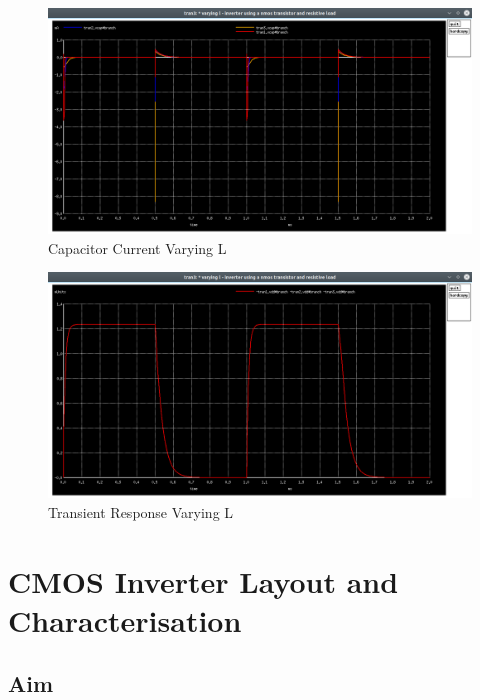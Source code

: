 \documentclass[12pt]{article}
\begin{document}
	\begin{figure}[H]
		\begin{center}
			\includegraphics[scale=0.25]{images/inverter_l_vcap.png}
			\caption{Capacitor Current Varying L}
			\label{fig::varying_l_vcap}
		\end{center}
	\end{figure}
	
	\begin{figure}[H]
		\begin{center}
			\includegraphics[scale=0.25]{images/inverter_l_vdd.png}
			\caption{Transient Response Varying L}
			\label{fig::varying_l_vdd}
		\end{center}
	\end{figure}
	
    
    
    \newpage
	\section{CMOS Inverter Layout and Characterisation} 
	
	\subsection{Aim}
	
\end{document}
